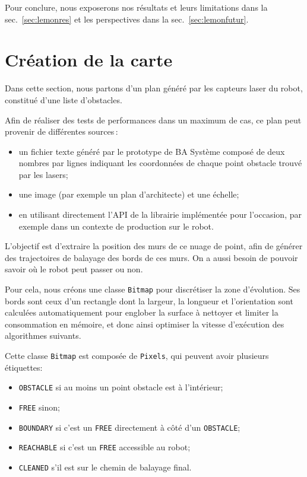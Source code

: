 \documentclass[french,A4paper,]{book}
\providecommand{\tightlist}{%
  \setlength{\itemsep}{0pt}\setlength{\parskip}{0pt}}
\begin{document}
Pour conclure, nous exposerons nos résultats et leurs limitations dans
la sec.~\ref{sec:lemonres} et les perspectives dans la
sec.~\ref{sec:lemonfutur}.

\section{Création de la carte}\label{sec:carto}

Dans cette section, nous partons d'un plan généré par les capteurs laser
du robot, constitué d'une liste d'obstacles.

Afin de réaliser des tests de performances dans un maximum de cas, ce
plan peut provenir de différentes sources\,:

\begin{itemize}
\tightlist
\item
  un fichier texte généré par le prototype de BA Système composé de deux
  nombres par lignes indiquant les coordonnées de chaque point obstacle
  trouvé par les lasers;
\item
  une image (par exemple un plan d'architecte) et une échelle;
\item
  en utilisant directement l'API de la librairie implémentée pour
  l'occasion, par exemple dans un contexte de production sur le robot.
\end{itemize}

L'objectif est d'extraire la position des murs de ce nuage de point,
afin de générer des trajectoires de balayage des bords de ces murs. On a
aussi besoin de pouvoir savoir où le robot peut passer ou non.

Pour cela, nous créons une classe \texttt{Bitmap} pour discrétiser la
zone d'évolution. Ses bords sont ceux d'un rectangle dont la largeur, la
longueur et l'orientation sont calculées automatiquement pour englober
la surface à nettoyer et limiter la consommation en mémoire, et donc
ainsi optimiser la vitesse d'exécution des algorithmes suivants.

Cette classe \texttt{Bitmap} est composée de \texttt{Pixels}, qui
peuvent avoir plusieurs étiquettes:

\begin{itemize}
\tightlist
\item
  \texttt{OBSTACLE} si au moins un point obstacle est à l'intérieur;
\item
  \texttt{FREE} sinon;
\item
  \texttt{BOUNDARY} si c'est un \texttt{FREE} directement à côté d'un
  \texttt{OBSTACLE};
\item
  \texttt{REACHABLE} si c'est un \texttt{FREE} accessible au robot;
\item
  \texttt{CLEANED} s'il est sur le chemin de balayage final.
\end{itemize}
\end{document}

